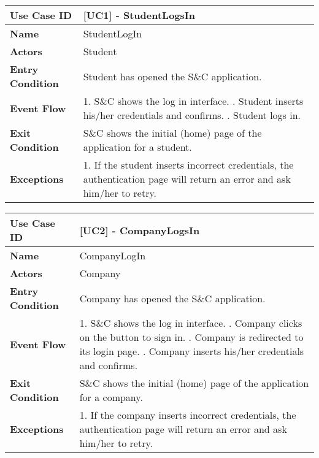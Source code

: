 \begin{table}[H]
    \centering
    \renewcommand{\arraystretch}{2}
    \begin{tabular}{|l|p{10cm}|}
    \hline
    \textbf{Use Case ID} & [UC1] - StudentLogsIn \\ \hline
    \textbf{Name} & StudentLogIn \\ \hline
    \textbf{Actors} & Student \\ \hline
    \textbf{Entry Condition} & Student has opened the S\&C application. \\ \hline
    \textbf{Event Flow} & 
    1. S\&C shows the log in interface. \newline
    2. Student inserts his/her credentials and confirms. \newline
    3. Student logs in. \\ \hline
    \textbf{Exit Condition} & S\&C shows the initial (home) page of the application for a student. \\ \hline
    \textbf{Exceptions} & 
    1. If the student inserts incorrect credentials, the authentication page will return an error and ask him/her to retry. \\ \hline
    \end{tabular}
\end{table}


\newpage

\begin{table}[H]
    \centering
    \renewcommand{\arraystretch}{2}
    \begin{tabular}{|l|p{10cm}|}
    \hline
    \textbf{Use Case ID} & [UC2] - CompanyLogsIn \\ \hline
    \textbf{Name} & CompanyLogIn \\ \hline
    \textbf{Actors} & Company \\ \hline
    \textbf{Entry Condition} & Company has opened the S\&C application. \\ \hline
    \textbf{Event Flow} & 
    1. S\&C shows the log in interface. \newline
    2. Company clicks on the button to sign in. \newline
    3. Company is redirected to its login page. \newline
    4. Company inserts his/her credentials and confirms. \\ \hline
    \textbf{Exit Condition} & S\&C shows the initial (home) page of the application for a company. \\ \hline
    \textbf{Exceptions} & 
    1. If the company inserts incorrect credentials, the authentication page will return an error and ask him/her to retry. \\ \hline
    \end{tabular}
\end{table}

